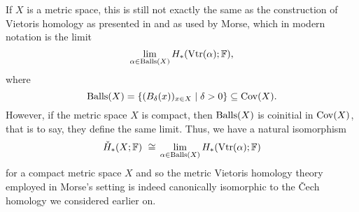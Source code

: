 If $X$ is a metric space, this is still not exactly the same as the construction of Vietoris homology as presented in \cite{MR1512371} and as used by Morse, which in modern notation is the limit
\begin{equation*}
    \lim_{\alpha \in \operatorname{Balls}(X)} H_{*} (\operatorname{Vtr} (\alpha); \mathbb{F}),
\end{equation*}
where 
\[
\operatorname{Balls} (X) = \left\{ ( B_{\delta} (x) )_{x \in X} \mid \delta > 0 \right\}
\subseteq \operatorname{Cov} (X).
\]
However, if the metric space $X$ is compact, then $\operatorname{Balls} (X)$ is coinitial in $\operatorname{Cov} (X)$, that is to say, they define the same limit.
Thus, we have a natural isomorphism
\[
\check{H}_{*} (X; \mathbb{F}) \ \cong \,
\lim_{\alpha \in \operatorname{Balls}(X)} H_{*} (\operatorname{Vtr} (\alpha); \mathbb{F})
\]
for a compact metric space $X$ and so the metric Vietoris homology theory employed in Morse's setting is indeed canonically isomorphic to the \v{C}ech homology we considered earlier on.
